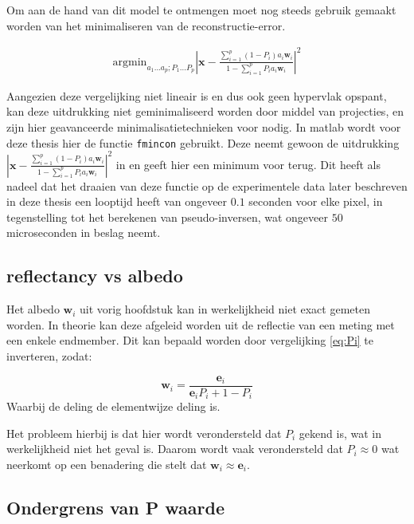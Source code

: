 \documentclass[12pt]{report}
\begin{document}
Om aan de hand van dit model te ontmengen moet nog steeds gebruik gemaakt worden van het minimaliseren van de reconstructie-error. 

\begin{align}
\text{argmin}_{a_1 ... a_p; P_1 ... P_p} \left| \bm{x} - \frac{\sum_{i=1}^p (1-P_i) a_{i} \bm{w}_{i}}{1-\sum_{i=1}^p P_i a_{i} \bm{w}_{i}} \right|^2
\end{align}

Aangezien deze vergelijking niet lineair is en dus ook geen hypervlak opspant, kan deze uitdrukking niet geminimaliseerd worden door middel van projecties, en zijn hier geavanceerde minimalisatietechnieken voor nodig. In matlab\cite{MATLAB} wordt voor deze thesis hier de functie \texttt{fmincon} gebruikt. Deze neemt gewoon de uitdrukking $\left| \bm{x} - \frac{\sum_{i=1}^p (1-P_i) a_{i} \bm{w}_{i}}{1-\sum_{i=1}^p P_i a_{i} \bm{w}_{i}} \right|^2$ in en geeft hier een minimum voor terug. Dit heeft als nadeel dat het draaien van deze functie op de experimentele data later beschreven in deze thesis een looptijd heeft van ongeveer $0.1$ seconden voor elke pixel, in tegenstelling tot het berekenen van pseudo-inversen, wat ongeveer $50$ microseconden in beslag neemt. 

\subsection{reflectancy vs albedo}

Het albedo  $\bm{w}_i$ uit vorig hoofdstuk kan in werkelijkheid niet exact gemeten worden. In theorie kan deze afgeleid worden uit de reflectie van een meting met een enkele endmember. Dit kan bepaald worden door vergelijking \ref{eq:Pi} te inverteren, zodat:

\begin{equation}
\bm{w}_i = \frac{\bm{e}_i}{\bm{e}_iP_i + 1 - P_i}
\end{equation}
Waarbij de deling de elementwijze deling is. 

Het probleem hierbij is dat hier wordt verondersteld dat $P_i$ gekend is, wat in werkelijkheid niet het geval is. Daarom wordt vaak verondersteld dat $P_i \approx 0$ wat neerkomt op een benadering die stelt dat $\bm{w}_i \approx \bm{e}_i$. 

\subsection{Ondergrens van P waarde}
\end{document}
